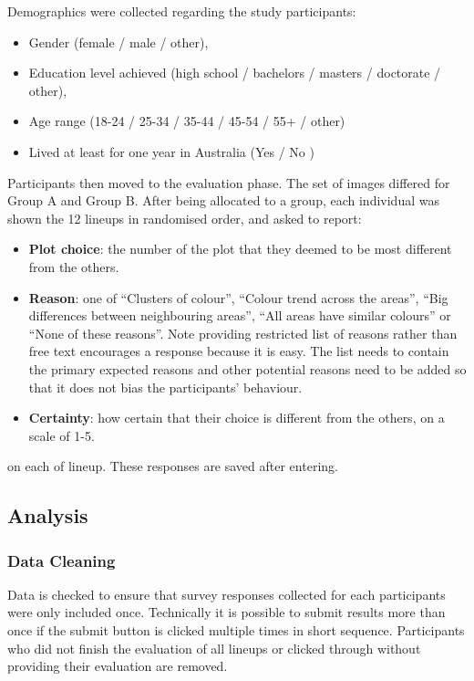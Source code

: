 \documentclass[
doublespace,
  times]{anzsauth}
\providecommand{\tightlist}{%
  \setlength{\itemsep}{0pt}\setlength{\parskip}{0pt}}
\begin{document}
Demographics were collected regarding the study participants:

\begin{itemize}
\tightlist
\item
  Gender (female / male / other),
\item
  Education level achieved (high school / bachelors / masters /
  doctorate / other),
\item
  Age range (18-24 / 25-34 / 35-44 / 45-54 / 55+ / other)
\item
  Lived at least for one year in Australia (Yes / No )
\end{itemize}

Participants then moved to the evaluation phase. The set of images
differed for Group A and Group B. After being allocated to a group, each
individual was shown the 12 lineups in randomised order, and asked to
report:

\begin{itemize}
\tightlist
\item
  \textbf{Plot choice}: the number of the plot that they deemed to be
  most different from the others.
\item
  \textbf{Reason}: one of ``Clusters of colour'', ``Colour trend across
  the areas'', ``Big differences between neighbouring areas'', ``All
  areas have similar colours'' or ``None of these reasons''. Note
  providing restricted list of reasons rather than free text encourages
  a response because it is easy. The list needs to contain the primary
  expected reasons and other potential reasons need to be added so that
  it does not bias the participants' behaviour.
\item
  \textbf{Certainty}: how certain that their choice is different from
  the others, on a scale of 1-5.
\end{itemize}

on each of lineup. These responses are saved after entering.

\subsection{Analysis}\label{analysis}

\subsubsection{Data Cleaning}\label{data-cleaning}

Data is checked to ensure that survey responses collected for each
participants were only included once. Technically it is possible to
submit results more than once if the submit button is clicked multiple
times in short sequence. Participants who did not finish the evaluation
of all lineups or clicked through without providing their evaluation are
removed.
\end{document}

